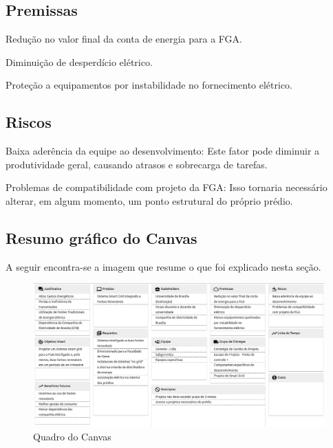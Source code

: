 \subsection{Premissas}
Redução no valor final da conta de energia para a FGA.
\par Diminuição de desperdício elétrico.
\par Proteção a equipamentos por instabilidade no fornecimento elétrico.

\subsection{Riscos}
Baixa aderência da equipe ao desenvolvimento: Este fator pode diminuir a produtividade geral, causando atrasos e sobrecarga de tarefas.
\par Problemas de compatibilidade com projeto da FGA: Isso tornaria necessário alterar, em algum momento, um ponto estrutural do próprio prédio.

\subsection{Resumo gráfico do Canvas}
A seguir encontra-se a imagem que resume o que foi explicado nesta seção.
\begin{figure}[!htb]
\centering
\includegraphics[width=0.75\paperwidth]{figuras/canvas.png}
\caption{Quadro do Canvas}
\end{figure}